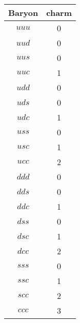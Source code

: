 \begin{tabular}{cc}
\toprule
Baryon & charm \\
\midrule
 $uuu$ &     0 \\
 $uud$ &     0 \\
 $uus$ &     0 \\
 $uuc$ &     1 \\
 $udd$ &     0 \\
 $uds$ &     0 \\
 $udc$ &     1 \\
 $uss$ &     0 \\
 $usc$ &     1 \\
 $ucc$ &     2 \\
 $ddd$ &     0 \\
 $dds$ &     0 \\
 $ddc$ &     1 \\
 $dss$ &     0 \\
 $dsc$ &     1 \\
 $dcc$ &     2 \\
 $sss$ &     0 \\
 $ssc$ &     1 \\
 $scc$ &     2 \\
 $ccc$ &     3 \\
\bottomrule
\end{tabular}
